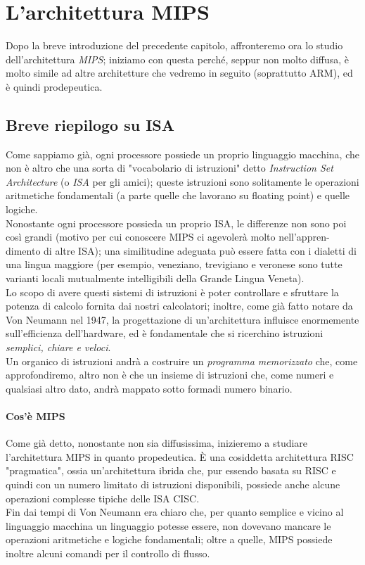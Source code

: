 \documentclass[class=book, crop=false]{standalone}
\begin{document}
\chapter{L'architettura MIPS}

Dopo la breve introduzione del precedente capitolo, affronteremo ora lo studio dell'architettura \textit{MIPS}; iniziamo con questa perché, seppur non molto diffusa, è molto simile ad altre architetture che vedremo in seguito (soprattutto ARM), ed è quindi prodepeutica.

\section{Breve riepilogo su ISA}
Come sappiamo già, ogni processore possiede un proprio linguaggio macchina, che non è altro che una sorta di "vocabolario di istruzioni" detto \emph{Instruction Set Architecture} (o \emph{ISA} per gli amici); queste istruzioni sono solitamente le operazioni aritmetiche fondamentali (a parte quelle che lavorano su floating point) e quelle logiche. \\
Nonostante ogni processore possieda un proprio ISA, le differenze non sono poi così grandi (motivo per cui conoscere MIPS ci agevolerà molto nell'appren-dimento di altre ISA); una similitudine adeguata può essere fatta con i dialetti di una lingua maggiore (per esempio, veneziano, trevigiano e veronese sono tutte varianti locali mutualmente intelligibili della Grande Lingua Veneta).\\
Lo scopo di avere questi sistemi di istruzioni è poter controllare e sfruttare la potenza di calcolo fornita dai nostri calcolatori; inoltre, come già fatto notare da Von Neumann nel 1947, la progettazione di un'architettura influisce enormemente sull'efficienza dell'hardware, ed è fondamentale che si ricerchino istruzioni \emph{semplici, chiare e veloci}.\\
Un organico di istruzioni andrà a costruire un \emph{programma memorizzato} che, come approfondiremo, altro non è che un insieme di istruzioni che, come numeri e qualsiasi altro dato, andrà mappato sotto formadi numero binario.

\subsubsection{Cos'è MIPS}
Come già detto, nonostante non sia diffusissima, inizieremo a studiare l'architettura MIPS in quanto propedeutica. È una cosiddetta architettura RISC "pragmatica", ossia un'architettura ibrida che, pur essendo basata su RISC e quindi con un numero limitato di istruzioni disponibili, possiede anche alcune operazioni complesse tipiche delle ISA CISC.\\
Fin dai tempi di Von Neumann era chiaro che, per quanto semplice e vicino al linguaggio macchina un linguaggio potesse essere, non dovevano mancare le operazioni aritmetiche e logiche fondamentali; oltre a quelle, MIPS possiede inoltre alcuni comandi per il controllo di flusso.
\end{document}
